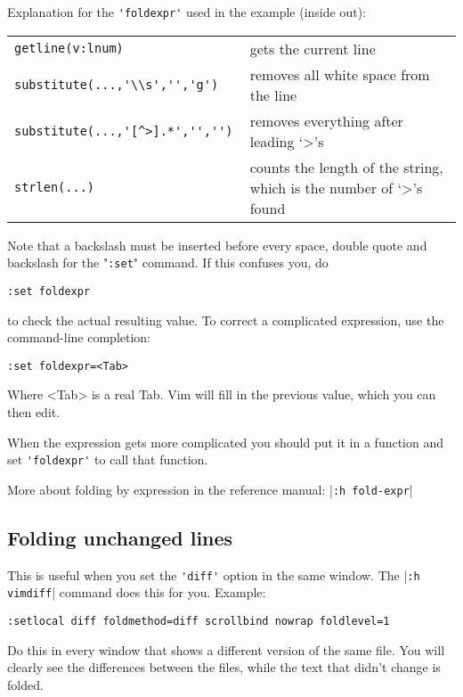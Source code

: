 Explanation for the \verb!'foldexpr'! used in the example (inside out):
\begin{center} \begin{tabular}{l l}
				\verb!getline(v:lnum) ! & gets the current line \\
				\verb!substitute(...,'\\s','','g') ! & removes all white space from the line \\
				\verb!substitute(...,'[^>].*','','') ! & removes everything after leading `>'s \\
				\verb!strlen(...) ! & counts the length of the string, which is the number of `>'s found \\
\end{tabular} \end{center}
Note that a backslash must be inserted before every space, double quote and backslash for the "\verb!:set!" command.
If this confuses you, do

\begin{Verbatim}[samepage=true]
 :set foldexpr
\end{Verbatim}

to check the actual resulting value.
To correct a complicated expression, use the command-line completion:

\begin{Verbatim}[samepage=true]
 :set foldexpr=<Tab>
\end{Verbatim}

Where <Tab> is a real Tab.
Vim will fill in the previous value, which you can then edit.

When the expression gets more complicated you should put it in a function and set \verb!'foldexpr'! to call that function.

More about folding by expression in the reference manual: |\verb!:h fold-expr!|
\subsection{Folding unchanged lines}
This is useful when you set the \verb!'diff'! option in the same window.
The |\verb!:h vimdiff!| command does this for you.
Example:

\begin{Verbatim}[samepage=true]
 :setlocal diff foldmethod=diff scrollbind nowrap foldlevel=1
\end{Verbatim}

Do this in every window that shows a different version of the same file.
You will clearly see the differences between the files, while the text that didn't change is folded.

